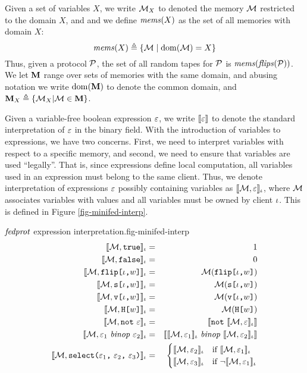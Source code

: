 Given a set of variables $X$, we write $\mathcal{M}_X$ to denoted the
memory $\mathcal{M}$ restricted to the domain $X$, and and we define
$\mathit{mems}(X)$ as the set of all memories with domain $X$:
$$
\mathit{mems}(X) \triangleq \{ \mathcal{M} \mid \mathrm{dom}(\mathcal{M}) = X \}
$$
Thus, given a protocol $\mathcal{P}$, the set of all random tapes for
$\mathcal{P}$ is $\mathit{mems}(\mathit{flips}(\mathcal{P}))$. We let $\mathbf{M}$ range
over sets of memories with the same domain, and abusing notation
we write $\mathrm{dom}(\mathbf{M})$ to denote the common domain,
and $\mathbf{M}_X \triangleq \{ \mathcal{M}_X | \mathcal{M} \in \mathbf{M} \}$.

Given a variable-free boolean expression $\varepsilon$, we write $\llbracket \varepsilon \rrbracket$
to denote the standard interpretation of $\varepsilon$ in the binary field.
With the introduction of variables to expressions, we have two
concerns. First, we need to interpret variables with respect to a
specific memory, and second, we need to ensure that variables are used
``legally''. That is, since expressions define local computation, all
variables used in an expression must belong to the same client.  Thus,
we denote interpretation of expressions $\varepsilon$ possibly containing
variables as $\llbracket \mathcal{M},\varepsilon \rrbracket_{\iota}$, where $\mathcal{M}$ associates
variables with values and all variables must be owned by client
$\iota$. This is defined in Figure \ref{fig-minifed-interp}.

\begin{fpfig}[t]{$\mathit{fedprot}$ expression interpretation.}{fig-minifed-interp}
\begin{eqnarray*}
\lcod{\store, \etrue}{\cid} &=& 1\\
\lcod{\store, \efalse}{\cid} &=& 0\\
\lcod{\store, \flip{\cid}{w}}{\cid} &=& \store(\flip{\cid}{w})\\
\lcod{\store, \secret{\cid}{w}}{\cid} &=& \store(\secret{\cid}{w})\\
\lcod{\store, \view{\cid}{w}}{\cid} &=& \store(\view{\cid}{w})\\
\lcod{\store, \oracle{w}}{\cid} &=& \store(\oracle{w})\\
\lcod{\store, \enot\ \be}{\cid} &=& \cod{\enot\ \lcod{\store,\be}{\cid}}\\
\lcod{\store, \be_1\ \mathit{binop}\ \be_2}{\cid} &=&
    \cod{\lcod{\store,\be_1}{\cid}\ \mathit{binop}\ \lcod{\store,\be_2}{\cid}}\\
\lcod{\store, \select{\be_1}{\be_2}{\be_3}}{\cid} &=&
             \begin{cases}
                \lcod{\store,\be_2}{\cid} & \text{if\ } \lcod{\store,\be_1}{\cid}\\
                \lcod{\store,\be_3}{\cid} & \text{if\ } \neg\lcod{\store,\be_1}{\cid}
             \end{cases}%
\end{eqnarray*}
\end{fpfig}

